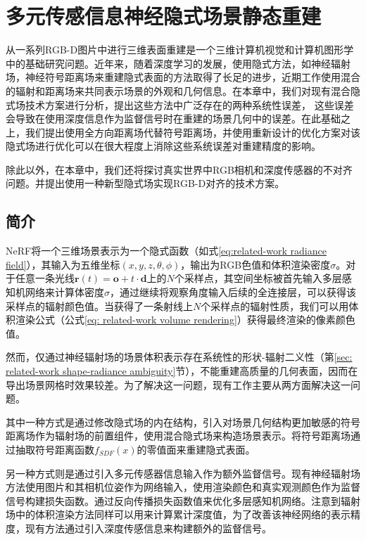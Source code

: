 \chapter{多元传感信息神经隐式场景静态重建}
从一系列RGB-D图片中进行三维表面重建是一个三维计算机视觉和计算机图形学中的基础研究问题。近年来，随着深度学习的发展，使用隐式方法，如神经辐射场\cite{mildenhall_nerf_2020}，神经符号距离场\cite{wang_neus_2021}来重建隐式表面的方法取得了长足的进步，近期工作\cite{wang_neus_2021, azinovic_neural_2022}使用混合的辐射和距离场来共同表示场景的外观和几何信息。在本章中，我们对现有混合隐式场技术方案进行分析，提出这些方法中广泛存在的两种系统性误差， 这些误差会导致在使用深度信息作为监督信号时在重建的场景几何中的误差。在此基础之上，我们提出使用全方向距离场\cite{houchens_neuralodf_2022}代替符号距离场，并使用重新设计的优化方案对该隐式场进行优化可以在很大程度上消除这些系统误差对重建精度的影响。

除此以外，在本章中，我们还将探讨真实世界中RGB相机和深度传感器的不对齐问题。并提出使用一种新型隐式场实现RGB-D对齐的技术方案。

\section{简介}
NeRF\cite{mildenhall_nerf_2020}将一个三维场景表示为一个隐式函数（如式\ref{eq:related-work radiance field}），其输入为五维坐标$(x,y,z,\theta,\phi)$，输出为RGB色值和体积渲染密度$\sigma$。对于任意一条光线$\mathbf{r}(t) = \mathbf{o} + t\cdot\mathbf{d}$上的$N$个采样点，其空间坐标被首先输入多层感知机网络来计算体密度$\sigma$，通过继续将观察角度输入后续的全连接层，可以获得该采样点的辐射颜色值。当获得了一条射线上$N$个采样点的辐射性质，我们可以用体积渲染公式（公式\ref{eq: related-work volume rendering}）获得最终渲染的像素颜色值。

然而，仅通过神经辐射场的场景体积表示存在系统性的形状-辐射二义性\cite{zhang_nerf_2020}（第\ref{sec: related-work shape-radiance ambiguity}节），不能重建高质量的几何表面，因而在导出场景网格时效果较差。为了解决这一问题，现有工作主要从两方面解决这一问题。

其中一种方式是通过修改隐式场的内在结构，引入对场景几何结构更加敏感的符号距离场作为辐射场的前置组件，使用混合隐式场来构造场景表示。将符号距离场通过抽取符号距离函数$f_{SDF}(x)$的零值面来重建隐式表面。

另一种方式则是通过引入多元传感器信息输入作为额外监督信号。现有神经辐射场方法使用图片和其相机位姿作为网络输入，使用渲染颜色和真实观测颜色作为监督信号构建损失函数。通过反向传播损失函数值来优化多层感知机网络。注意到辐射场中的体积渲染方法同样可以用来计算累计深度值，为了改善该神经网络的表示精度，现有方法通过引入深度传感信息来构建额外的监督信号\cite{deng_depth-supervised_2022, roessle_dense_2022, azinovic_neural_2022}。

